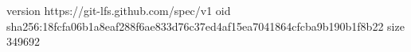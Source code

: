 version https://git-lfs.github.com/spec/v1
oid sha256:18fcfa06b1a8eaf288f6ae833d76c37ed4af15ea7041864cfcba9b190b1f8b22
size 349692
